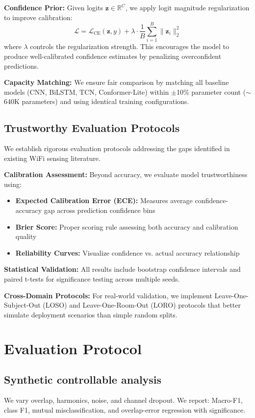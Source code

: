 \documentclass[10pt,conference]{IEEEtran}
\begin{document}
\textbf{Confidence Prior:} Given logits $\mathbf{z} \in \mathbb{R}^C$, we apply logit magnitude regularization to improve calibration:
\begin{equation}
\mathcal{L} = \mathcal{L}_{\text{CE}}(\mathbf{z}, y) + \lambda \cdot \frac{1}{B}\sum_{i=1}^B \|\mathbf{z}_i\|_2^2
\end{equation}
where $\lambda$ controls the regularization strength. This encourages the model to produce well-calibrated confidence estimates by penalizing overconfident predictions.

\textbf{Capacity Matching:} We ensure fair comparison by matching all baseline models (CNN, BiLSTM, TCN, Conformer-Lite) within $\pm$10\% parameter count ($\sim$640K parameters) and using identical training configurations.

\subsection{Trustworthy Evaluation Protocols}
We establish rigorous evaluation protocols addressing the gaps identified in existing WiFi sensing literature.

\textbf{Calibration Assessment:} Beyond accuracy, we evaluate model trustworthiness using:
\begin{itemize}
\item \textbf{Expected Calibration Error (ECE):} Measures average confidence-accuracy gap across prediction confidence bins
\item \textbf{Brier Score:} Proper scoring rule assessing both accuracy and calibration quality
\item \textbf{Reliability Curves:} Visualize confidence vs. actual accuracy relationship
\end{itemize}

\textbf{Statistical Validation:} All results include bootstrap confidence intervals and paired t-tests for significance testing across multiple seeds.

\textbf{Cross-Domain Protocols:} For real-world validation, we implement Leave-One-Subject-Out (LOSO) and Leave-One-Room-Out (LORO) protocols that better simulate deployment scenarios than simple random splits.

\section{Evaluation Protocol}
\subsection{Synthetic controllable analysis}
We vary overlap, harmonics, noise, and channel dropout. We report: Macro-F1, class F1, mutual misclassification, and overlap-error regression with significance.
\end{document}
